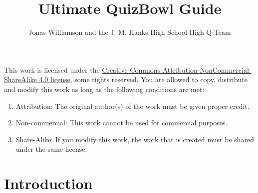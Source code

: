 \documentclass[12pt]{book}
\begin{document}
	\frontmatter
	\title{Ultimate QuizBowl Guide}
	\author{Jonas Williamson and the  J. M. Hanks High School High-Q Team}
	\date{\the\year}
	\maketitle
	\begin{center}

			\huge \cc \the\year
			\vspace{0.5 in}
			
			\byncsa
	\normalsize
		\end{center}
		\vspace{2 in}	
	This work is licensed under the \href{https://creativecommons.org/licenses/by-nc-sa/4.0/legalcode}{Creative Commons Attribution-NonCommercial-ShareAlike 4.0 license}, some rights reserved.  You are allowed to copy, distribute and modify this work as long as the following conditions are met:
	\begin{enumerate}
		\item Attribution: The original author(s) of the work must be given proper credit.
		\item Non-commercial: This work cannot be used for commercial purposes.
		\item Share-Alike: If you modify this work, the work that is created must be shared under the same license. 
	\end{enumerate}


	
	
	
	
	
	
	\tableofcontents

	\mainmatter
	
	
\chapter{Introduction}





	
	







	

		
	









		
		
	
		
\end{document}
